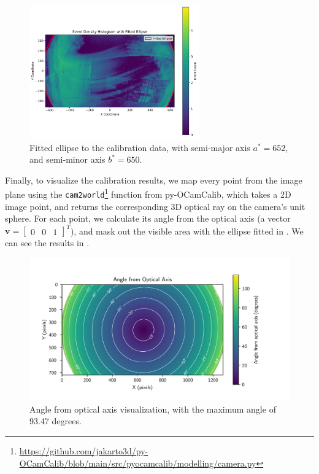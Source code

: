 \begin{figure}[H]
	\centering
	\includegraphics[width=0.65\textwidth]{./fig/svg/ellipse_fit.pdf}
	\caption{Fitted ellipse to the calibration data, with semi-major axis $a^* = 652$, and semi-minor axis $b^* = 650$.}
	\label{fig:ellipse_fit}
\end{figure}

Finally, to visualize the calibration results, we map every point from the image plane using the \texttt{cam2world}\footnote{\url{https://github.com/jakarto3d/py-OCamCalib/blob/main/src/pyocamcalib/modelling/camera.py}}
function from py-OCamCalib, which takes a 2D image point, and returns
the corresponding 3D optical ray on the camera's unit sphere. For each point, we calculate its angle from the optical axis (a vector $\mathbf{v} = \begin{bmatrix} 0 & 0 & 1 \end{bmatrix}^{T}$),
and mask out the visible area with the ellipse fitted in . We can see the results in .

\begin{figure}[H]
	\centering
	\includegraphics[width=1.0\textwidth]{./fig/pgfplot/evk4_viz.pdf}
	\caption{Angle from optical axis visualization, with the maximum angle of 93.47 degrees.}
	\label{fig:calibration_viz}
\end{figure}

